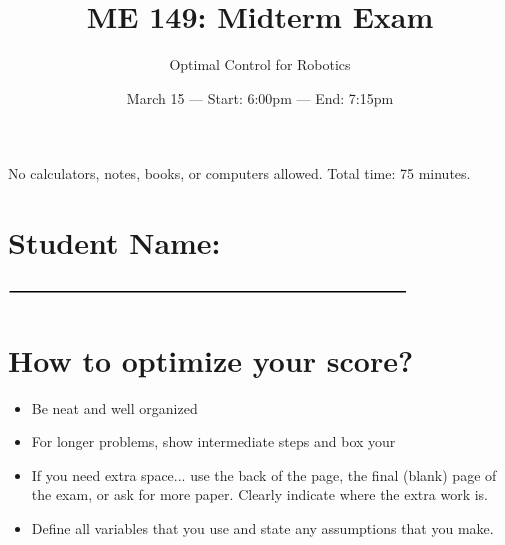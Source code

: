 


\newcommand{\scoreMark}[0]{$\rule{1.5cm}{0.15mm}$ / $\rule{1.5cm}{0.15mm}$}

\title{ME 149:  Midterm Exam}
\date{March 15  ---  Start: 6:00pm  ---  End: 7:15pm}
\author{Optimal Control for Robotics}

\maketitle

\begin{abstract*}
No calculators, notes, books, or computers allowed. Total time:  75 minutes.
\end{abstract*}

\vspace{1em}

\section*{Student Name:  $\rule{10cm}{0.3mm}$}

\vspace{1em}

\section*{How to optimize your score?}

\begin{itemize}  \setlength\itemsep{0.1em} \setlength\itemindent{18pt}
  \item Be neat and well organized
  \item For longer problems, show intermediate steps and box your
  \item If you need extra space...
        use the back of the page,
        the final (blank) page of the exam,
        or ask for more paper.
        Clearly indicate where the extra work is.
  \item Define all variables that you use and state any assumptions that you make.
\end{itemize}


